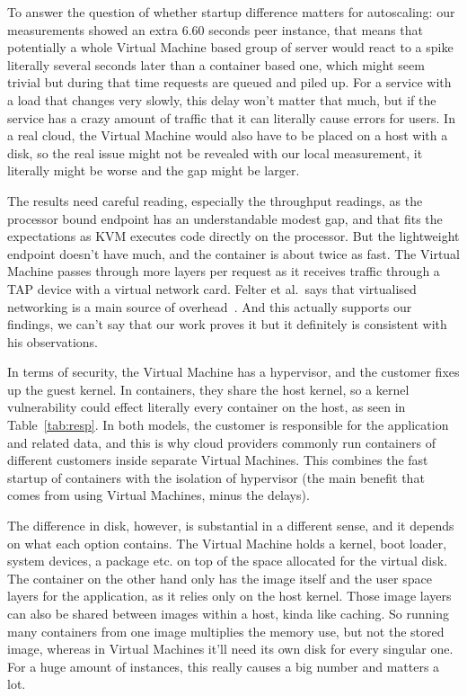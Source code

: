 \documentclass[conference,a4paper]{IEEEtran}
\begin{document}
To answer the question of whether startup difference matters for autoscaling: our measurements showed an extra 6.60 seconds peer instance, that means that potentially a whole Virtual Machine based group of server would react to a spike literally several seconds later than a container based one, which might seem trivial but during that time requests are queued and piled up. For a service with a load that changes very slowly, this delay won’t matter that much, but if the service has a crazy amount of traffic that it can literally cause errors for users. In a real cloud, the Virtual Machine would also have to be placed on a host with a disk, so the real issue might not be revealed with our local measurement, it literally might be worse and the gap might be larger.

The results need careful reading, especially the throughput readings, as the processor bound endpoint has an understandable modest gap, and that fits the expectations as KVM executes code directly on the processor. But the lightweight endpoint doesn’t have much, and the container is about twice as fast. The Virtual Machine passes through more layers per request as it receives traffic through a TAP device with a virtual network card. Felter et al.\ says that virtualised networking is a main source of overhead~\cite{b3}. And this actually supports our findings, we can’t say that our work proves it but it definitely is consistent with his observations.

In terms of security, the Virtual Machine has a hypervisor, and the customer fixes up the guest kernel. In containers, they share the host kernel, so a kernel vulnerability could effect literally every container on the host, as seen in Table~\ref{tab:resp}. In both models, the customer is responsible for the application and related data, and this is why cloud providers commonly run containers of different customers inside separate Virtual Machines. This combines the fast startup of containers with the isolation of hypervisor (the main benefit that comes from using Virtual Machines, minus the delays).

The difference in disk, however, is substantial in a different sense, and it depends on what each option contains. The Virtual Machine holds a kernel, boot loader, system devices, a package etc. on top of the space allocated for the virtual disk. The container on the other hand only has the image itself and the user space layers for the application, as it relies only on the host kernel. Those image layers can also be shared between images within a host, kinda like caching. So running many containers from one image multiplies the memory use, but not the stored image, whereas in Virtual Machines it’ll need its own disk for every singular one. For a huge amount of instances, this really causes a big number and matters a lot.
\end{document}
